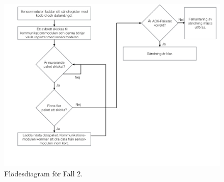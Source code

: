 \documentclass[a4paper,12pt,fleqn]{article}
\begin{document}
\begin{figure}[htp] %
  \begin{center}
  \includegraphics[keepaspectratio=true,width=\linewidth]{bilder/SPIbild003.jpg}  %
  \end{center}
  \caption{Flödesdiagram för Fall 2.} %
  \label{fig:case2flow}
\end{figure}
\end{document}
